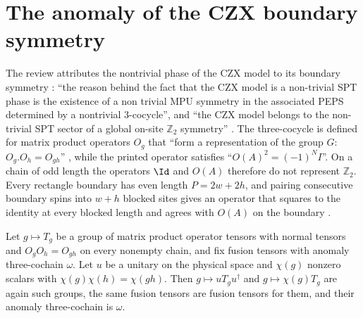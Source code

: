 \section{The anomaly of the CZX boundary symmetry}%
\label{sec:czx_boundary_anomaly}

The review attributes the nontrivial phase of the CZX model to its boundary
symmetry \cite[Appendix~A, ``The CZX MPU'']{Cirac2021Matrix}: ``the reason
behind the fact that the CZX model is a non-trivial SPT phase is the existence
of a non trivial MPU symmetry in the associated PEPS determined by a
nontrivial 3-cocycle'', and ``the CZX model belongs to the non-trivial SPT
sector of a global on-site $\mathbb{Z}_2$ symmetry''
\cite[Appendix~A, ``The CZX model'']{Cirac2021Matrix}. The three-cocycle is
defined for matrix product operators $O_g$ that ``form a representation of the
group $G$: $O_g.O_h=O_{gh}$'' \cite[``Symmetric PEPS'']{Cirac2021Matrix}, while the
printed operator satisfies ``${O}(A)^2=(-1)^N I$''. On a chain of odd length
the operators $\Id$ and $O(A)$ therefore do not represent $\mathbb Z_2$.
Every rectangle boundary has even length $P=2w+2h$, and pairing consecutive
boundary spins into $w+h$ blocked sites gives an operator that squares to the
identity at every blocked length and agrees with $O(A)$ on the boundary
\cite{gap:rmp_peps_czx_boundary_chain}.

\begin{lemma}%
    \label{lem:czx_boundary_anomaly_transport}
    \leanok
    Let $g\mapsto T_g$ be a group of matrix product operator tensors with
    normal tensors and $O_gO_h=O_{gh}$ on every nonempty chain, and fix
    fusion tensors with anomaly three-cochain $\omega$. Let $u$ be a unitary
    on the physical space and $\chi(g)$ nonzero scalars with
    $\chi(g)\chi(h)=\chi(gh)$. Then $g\mapsto uT_gu^\dagger$ and
    $g\mapsto\chi(g)T_g$ are again such groups, the same fusion tensors are
    fusion tensors for them, and their anomaly three-cochain is $\omega$.
\end{lemma}

